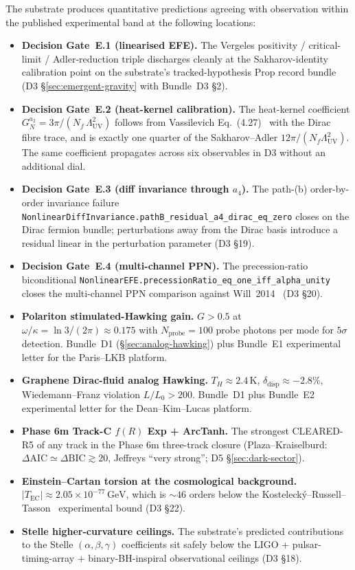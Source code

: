 \documentclass[aps,prd,reprint,nofootinbib,superscriptaddress]{revtex4-2}
\begin{document}
The substrate produces quantitative predictions agreeing with
observation within the published experimental band at the following
locations:

\begin{itemize}
\item \textbf{Decision Gate~E.1 (linearised EFE).} The Vergeles
  positivity / critical-limit / Adler-reduction triple discharges
  cleanly at the Sakharov-identity calibration point on the
  substrate's tracked-hypothesis Prop record bundle (D3
  \S\ref{sec:emergent-gravity} with Bundle~D3 \S 2).
\item \textbf{Decision Gate~E.2 (heat-kernel calibration).} The
  heat-kernel coefficient $G_N^{a_2} = 3\pi/(N_f\,\Lambda_{\mathrm{UV}}^{2})$
  follows from Vassilevich Eq.~(4.27)~\cite{Vassilevich2003} with the
  Dirac fibre trace, and is exactly one quarter of the Sakharov--Adler
  $12\pi/(N_f\Lambda_{\mathrm{UV}}^{2})$. The same coefficient propagates
  across six observables in D3 without an additional dial.
\item \textbf{Decision Gate~E.3 (diff invariance through $a_4$).}
  The path-(b) order-by-order invariance failure
  \texttt{NonlinearDiffInvariance.pathB\_residual\_a4\_dirac\_eq\_zero}
  closes on the Dirac fermion bundle; perturbations away from the
  Dirac basis introduce a residual linear in the perturbation
  parameter (D3 \S 19).
\item \textbf{Decision Gate~E.4 (multi-channel PPN).} The
  precession-ratio biconditional
  \texttt{NonlinearEFE.precessionRatio\_eq\_one\_iff\_alpha\_unity}
  closes the multi-channel PPN comparison against
  Will~2014~\cite{Will2014} (D3 \S 20).
\item \textbf{Polariton stimulated-Hawking gain.} $G > 0.5$ at
  $\omega/\kappa = \ln 3 / (2\pi) \approx 0.175$ with
  $N_{\mathrm{probe}} = 100$ probe photons per mode for $5\sigma$
  detection. Bundle~D1 (\S\ref{sec:analog-hawking}) plus Bundle~E1
  experimental letter for the Paris--LKB platform.
\item \textbf{Graphene Dirac-fluid analog Hawking.} $T_H \approx 2.4\,$K,
  $\delta_{\mathrm{disp}} \approx -2.8\%$, Wiedemann--Franz violation
  $L/L_0 > 200$. Bundle~D1 plus Bundle~E2 experimental letter for the
  Dean--Kim--Lucas platform.
\item \textbf{Phase 6m Track-C $f(R)$ Exp + ArcTanh.} The strongest
  CLEARED-R5 of any track in the Phase 6m three-track closure
  (Plaza--Kraiselburd:
  $\Delta\!\mathrm{AIC} \simeq \Delta\!\mathrm{BIC} \gtrsim 20$,
  Jeffreys ``very strong''; D5 \S\ref{sec:dark-sector}).
\item \textbf{Einstein--Cartan torsion at the cosmological background.}
  $|T_{\mathrm{EC}}| \approx 2.05\times 10^{-77}\,\mathrm{GeV}$, which
  is $\sim 46$ orders below the
  Kosteleck\'y--Russell--Tasson~\cite{KosteleckyRussellTasson2008}
  experimental bound (D3 \S 22).
\item \textbf{Stelle higher-curvature ceilings.} The substrate's
  predicted contributions to the Stelle $(\alpha,\beta,\gamma)$
  coefficients sit safely below the LIGO + pulsar-timing-array +
  binary-BH-inspiral observational ceilings (D3 \S 18).
\end{itemize}
\end{document}

